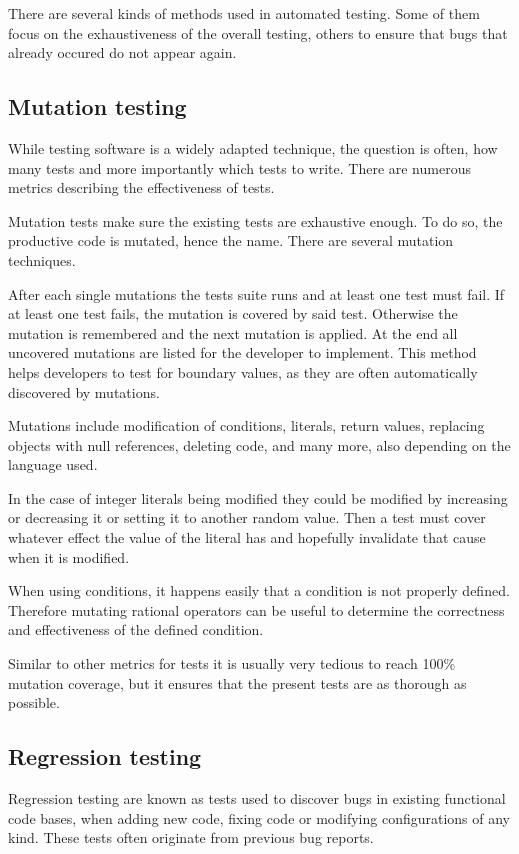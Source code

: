 There are several kinds of methods used in automated testing. Some of them
focus on the exhaustiveness of the overall testing, others to ensure that bugs
that already occured do not appear again.

\subsection{Mutation testing}

While testing software is a widely adapted technique, the question is often,
how many tests and more importantly which tests to write. There are numerous
metrics describing the effectiveness of tests.

Mutation tests make sure the existing tests are exhaustive enough. To do so,
the productive code is mutated, hence the name. There are several mutation
techniques.

After each single mutations the tests suite runs and at least one test must
fail. If at least one test fails, the mutation is covered by said test.
Otherwise the mutation is remembered and the next mutation is applied. At the
end all uncovered mutations are listed for the developer to implement. This
method helps developers to test for boundary values, as they are often
automatically discovered by mutations.

Mutations include modification of conditions, literals, return values,
replacing objects with null references, deleting code, and many more, also
depending on the language used.

In the case of integer literals being modified they could be modified by
increasing or decreasing it or setting it to another random value. Then a test
must cover whatever effect the value of the literal has and hopefully
invalidate that cause when it is modified.

When using conditions, it happens easily that a condition is not properly
defined. Therefore mutating rational operators can be useful to determine the
correctness and effectiveness of the defined condition.

Similar to other metrics for tests it is usually very tedious to reach 100\%
mutation coverage, but it ensures that the present tests are as thorough as
possible.

\subsection{Regression testing}

Regression testing are known as tests used to discover bugs in existing
functional code bases, when adding new code, fixing code or modifying
configurations of any kind. These tests often originate from previous bug
reports.

